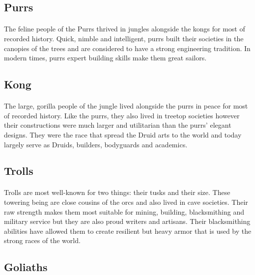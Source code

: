 \subsection{Purrs}

\paragraph{} The feline people of the Purrs thrived in jungles alongside the kongs for most of recorded history. Quick, nimble and intelligent, purrs built their societies in the canopies of the trees and are considered to have a strong engineering tradition. In modern times, purrs expert building skills make them great sailors.

\subsection{Kong}

\paragraph{} The large, gorilla people of the jungle lived alongside the purrs in peace for most of recorded history. Like the purrs, they also lived in treetop societies however their constructions were much larger and utilitarian than the purrs' elegant designs. They were the race that spread the Druid arts to the world and today largely serve as Druids, builders, bodyguards and academics.

\subsection{Trolls}

\paragraph{} Trolls are most well-known for two things: their tusks and their size. These towering being are close cousins of the orcs and also lived in cave societies. Their raw strength makes them most suitable for mining, building, blacksmithing and military service but they are also proud writers and artisans. Their blacksmithing abilities have allowed them to create resilient but heavy armor that is used by the strong races of the world.

\subsection{Goliaths}

